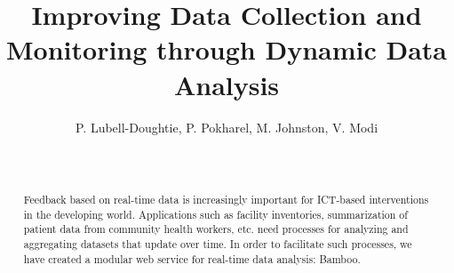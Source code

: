 \documentclass{acm_proc_article-sp}
\begin{document}
\title{Improving Data Collection and Monitoring through Dynamic Data Analysis}
\subtitle{}
%
%
%
%
%

%
\author{
%
%
\alignauthor
P. Lubell-Doughtie, P. Pokharel, M. Johnston, V. Modi\\
       \\
       \\
}

\maketitle
\begin{abstract}
Feedback based on real-time data is increasingly important for ICT-based interventions in the developing world. Applications such as 
facility inventories,
summarization of patient data from community health workers, 
etc. need processes for analyzing and aggregating datasets that update over time. In order to facilitate such processes, we have created a modular web service for real-time data analysis: Bamboo.
\end{abstract}
\end{document}

